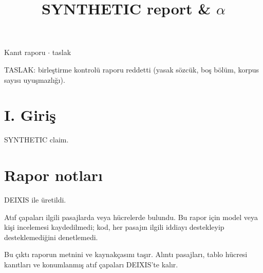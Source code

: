 \documentclass[journal]{IEEEtran}
\begin{document}
\renewcommand{\abstractname}{Özet}
\renewcommand{\IEEEkeywordsname}{Dizin Terimleri}
\renewcommand{\refname}{Kaynaklar}

\title{SYNTHETIC report \& \ensuremath{\alpha}}

\maketitle

\noindent Kanıt raporu \ensuremath{\cdot} taslak

\noindent TASLAK: birleştirme kontrolü raporu reddetti (yasak sözcük, boş bölüm, korpus sayısı uyuşmazlığı).

\section*{I. Giriş}

SYNTHETIC claim. \cite{Synth26}

\section*{Rapor notları}

DEIXIS ile üretildi.

Atıf çapaları ilgili pasajlarda veya hücrelerde bulundu. Bu rapor için model veya kişi incelemesi kaydedilmedi; kod, her pasajın ilgili iddiayı destekleyip desteklemediğini denetlemedi.

Bu çıktı raporun metnini ve kaynakçasını taşır. Alıntı pasajları, tablo hücresi kanıtları ve konumlanmış atıf çapaları DEIXIS'te kalır.




\end{document}
